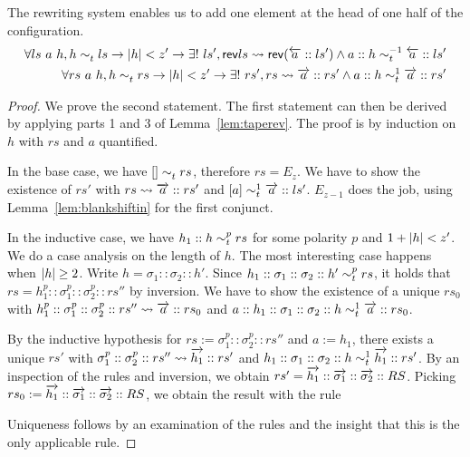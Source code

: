 \documentclass[a4paper,UKenglish,cleveref, autoref]{lipics-v2019}
\newcommand{\strent}{\rightsquigarrow}
\begin{document}
\begin{lemma}\label{lem:tapeadd}
  The rewriting system enables us to add one element at the head of one half of the configuration.
  \begin{align*}
    \forall ls~a~h, h \reprt{} ls \rightarrow \length{h} < z' \rightarrow \exists!~ls', \rev{ls} \strent{} \rev{(\polneg{a} :: ls')} \land a :: h \reprt{-1} \polneg{a} :: ls' \\
    \forall rs~a~h, h \reprt{} rs \rightarrow \length{h} < z' \rightarrow \exists!~rs', rs \strent{} \polpos{a} :: rs' \land a :: h \reprt{1} \polpos{a} :: rs'
  \end{align*}
\end{lemma}
\begin{proof}
  We prove the second statement. The first statement can then be derived by applying parts 1 and 3 of Lemma~\ref{lem:taperev}. 
  The proof is by induction on $h$ with $rs$ and $a$ quantified. 

  In the base case, we have $[] \sim_t^{} rs$, therefore $rs = E_z$. We have to show the existence of $rs'$ with $rs \strent{} \polpos{a} :: rs'$ and $[a] \sim_t^{1} \overrightarrow{a} :: ls'$. $E_{z-1}$ does the job, using Lemma~\ref{lem:blankshiftin} for the first conjunct. 

  In the inductive case, we have $h_1 :: h \sim_t^{p} rs$ for some polarity $p$ and $1 +{|h|} < z'$. We do a case analysis on the length of $h$. The most interesting case happens when $|h| \ge 2$. Write $h = \sigma_1 :: \sigma_2 :: h'$. 
  Since $h_1 :: \sigma_1 :: \sigma_2 ::h' \sim_t^{p} rs$, it holds that $rs = h_1^p :: \sigma_1^p :: \sigma_2^p :: rs''$ by inversion. 
  We have to show the existence of a unique $rs_0$ with $h_1^p :: \sigma_1^p :: \sigma_2^p :: rs'' \strent{} \polpos{a} :: rs_0$ and $a::h_1 :: \sigma_1 :: \sigma_2 :: h \sim_t^{1} \overrightarrow{a} :: rs_0$. 

  By the inductive hypothesis for $rs := \sigma_1^p :: \sigma_2^p :: rs''$ and $a := h_1$, there exists a unique $rs'$ with $\sigma_1^p :: \sigma_2^p :: rs'' \strent{} \polpos{h_1} :: rs'$ and $h_1 :: \sigma_1 :: \sigma_2 :: h \sim_t^{1} \overrightarrow{h_1} :: rs'$. 
  By an inspection of the rules and inversion, we obtain $rs' = \overrightarrow{h_1} :: \overrightarrow{\sigma_1} :: \overrightarrow{\sigma_2} :: RS$. 
  Picking $rs_0 := \overrightarrow{h_1} :: \overrightarrow{\sigma_1} :: \overrightarrow{\sigma_2} :: RS$, we obtain the result with the rule
  \begin{center}
  \end{center}
  Uniqueness follows by an examination of the rules and the insight that this is the only applicable rule. 
  \end{proof}
\end{document}
